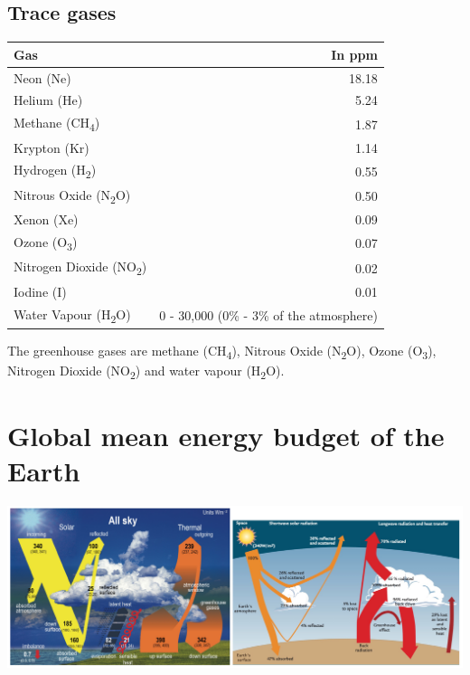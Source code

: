\documentclass[11pt]{article}
\begin{document}
\subsection{Trace gases}
\label{sec:org2baafe0}
\begin{center}
\begin{tabular}{l|r}
Gas & In ppm\\
\hline
Neon (Ne) & 18.18\\
Helium (He) & 5.24\\
Methane (CH\textsubscript{4}) & 1.87\\
Krypton (Kr) & 1.14\\
Hydrogen (H\textsubscript{2}) & 0.55\\
Nitrous Oxide (N\textsubscript{2}O) & 0.50\\
Xenon (Xe) & 0.09\\
Ozone (O\textsubscript{3}) & 0.07\\
Nitrogen Dioxide (NO\textsubscript{2}) & 0.02\\
Iodine (I) & 0.01\\
Water Vapour (H\textsubscript{2}O) & 0 - 30,000 (0\% - 3\% of the atmosphere)\\
\end{tabular}
\end{center}

The greenhouse gases are methane (CH\textsubscript{4}), Nitrous Oxide (N\textsubscript{2}O), Ozone (O\textsubscript{3}), Nitrogen Dioxide (NO\textsubscript{2}) and water vapour (H\textsubscript{2}O).
\section{Global mean energy budget of the Earth}
\label{sec:org8c8ba86}
\begin{center}
\includegraphics[width=.9\linewidth]{./images/global-mean-energy-budget.png}
\end{center}
\end{document}
